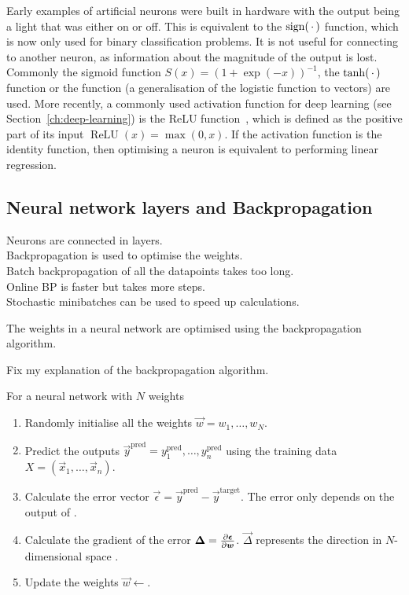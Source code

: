 Early examples of artificial neurons were built in hardware with the output being a light that was either on or off.
This is equivalent to the \(\operatorname{sign}(\,\cdot\,)\) function, which is now only used for binary classification problems.
It is not useful for connecting to another neuron, as information about the magnitude of the output is lost.
Commonly the sigmoid function \(S(x) = (1 + \exp(-x))^{-1}\), the \(\tanh(\,\cdot\,)\) function or the  function (a generalisation of the logistic function to vectors) are used.
More recently, a commonly used activation function for deep learning (see Section~\ref{ch:deep-learning}) is the \ac{ReLU} function~\autocite{ramachandran2017}, which is defined as the positive part of its input \(\operatorname{ReLU}(x) = \max(0, x)\).
If the activation function is the identity function, then optimising a neuron is equivalent to performing linear regression.

\subsection{Neural network layers and Backpropagation} \label{ch:backpropagation}

\begin{todo}
	Neurons are connected in layers. \\
	Backpropagation is used to optimise the weights. \\
	Batch backpropagation of all the datapoints takes too long. \\
	Online BP is faster but takes more steps. \\
	Stochastic minibatches can be used to speed up calculations. 
\end{todo}

The weights in a neural network are optimised using the backpropagation algorithm.

\begin{todo}
	Fix my explanation of the backpropagation algorithm.
\end{todo}

For a neural network with \(N\) weights
\begin{enumerate}
	\item Randomly initialise all the weights \(\vec{w} = w_1, \dots, w_N\).
	\item Predict the outputs \(\vec{y}^\text{pred} = y^\text{pred}_1, \dots, y^\text{pred}_n\) using the training data \(X = (\vec{x}_1, \dots, \vec{x}_n)\).
	\item Calculate the error vector \(\vec{\epsilon} = \vec{y}^\text{pred} - \vec{y}^\text{target}\). The error only depends on the output of .
	\item Calculate the gradient of the error \(\bm{\Delta} = \pdv{\bm{\epsilon}}{\bm{w}}\). \(\vec{\Delta}\) represents the direction in \(N\)-dimensional space .
	\item Update the weights \(\vec{w} \leftarrow \).
\end{enumerate}

